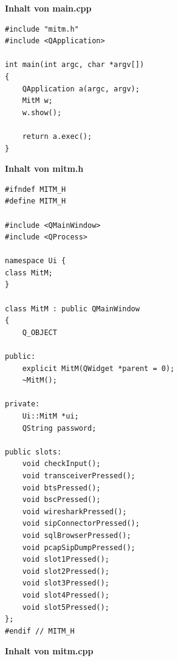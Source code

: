 \textbf{Inhalt von main.cpp}

\begin{lstlisting}
#include "mitm.h"
#include <QApplication>

int main(int argc, char *argv[])
{
    QApplication a(argc, argv);
    MitM w;
    w.show();

    return a.exec();
}
\end{lstlisting}



\vspace{2cm}
\textbf{Inhalt von mitm.h}



\begin{lstlisting}
#ifndef MITM_H
#define MITM_H

#include <QMainWindow>
#include <QProcess>

namespace Ui {
class MitM;
}

class MitM : public QMainWindow
{
    Q_OBJECT

public:
    explicit MitM(QWidget *parent = 0);
    ~MitM();

private:
    Ui::MitM *ui;
    QString password;

public slots:
    void checkInput();
    void transceiverPressed();
    void btsPressed();
    void bscPressed();
    void wiresharkPressed();
    void sipConnectorPressed();
    void sqlBrowserPressed();
    void pcapSipDumpPressed();
    void slot1Pressed();
    void slot2Pressed();
    void slot3Pressed();
    void slot4Pressed();
    void slot5Pressed();
};
#endif // MITM_H
\end{lstlisting}



\vspace{2cm}
\textbf{Inhalt von mitm.cpp}

